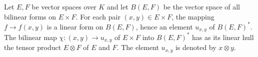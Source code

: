 Let $E, F$ be vector spaces over $K$ and let $B(E, F)$ be the vector space of all bilinear forms on $E \times F$. For each pair $(x, y) \in E \times F$, the mapping $f \rightarrow f(x, y)$ is a linear form on $B(E, F)$, hence an element $u_{x,y}$ of $B(E, F)^*$. The bilinear map $\chi: (x, y) \rightarrow u_{x,y}$ of $E \times F$ into $B(E, F)^*$ has as its linear hull the tensor product $E \otimes F$ of $E$ and $F$. The element $u_{x,y}$ is denoted by $x \otimes y$.
